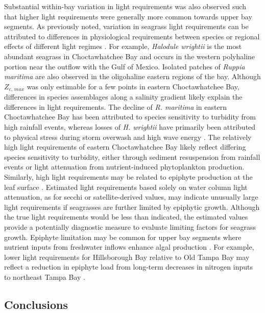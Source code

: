 \documentclass[letterpaper,12pt,oneside]{article}\usepackage[]{graphicx}\usepackage[]{color}
\begin{document}
Substantial within-bay variation in light requirements was also observed such that higher light requirements were generally more common towards upper bay segments.  As previously noted, variation in seagrass light requirements can be attributed to differences in physiological requirements between species or regional effects of different light regimes \citep{Choice14}.  For example, \textit{Halodule wrightii} is the most abundant seagrass in Choctawhatchee Bay and occurs in the western polyhaline portion near the outflow with the Gulf of Mexico.  Isolated patches of \textit{Ruppia maritima} are also observed in the oligohaline eastern regions of the bay. Although $Z_{c,\,max}$ was only estimable for a few points in eastern Choctawhatchee Bay, differences in species assemblages along a salinity gradient likely explain the differences in light requirements. The decline of \textit{R. maritima} in eastern Choctawhatchee Bay has been attributed to species sensitivity to turbidity from high rainfall events, whereas losses of \textit{H. wrightii} have primarily been attributed to physical stress during storm overwash and high wave energy .  The relatively high light requirements of eastern Choctawhatchee Bay likely reflect differing species sensitivity to turbidity, either through sediment resuspension from rainfall events or light attenuation from nutrient-induced phytoplankton production.  Similarly, high light requirements may be related to epiphyte production at the leaf surface \citep{Kemp04}.  Estimated light requirements based solely on water column light attenuation, as for secchi or satellite-derived values, may indicate unusually large light requirements if seagrasses are further limited by epiphytic growth.  Although the true light requirements would be less than indicated, the estimated values provide a potentially diagnostic measure to evaluate limiting factors for seagrass growth.  Epiphyte limitation may be common for upper bay segments where nutrient inputs from freshwater inflows enhance algal production \citep{Kemp04}.  For example, lower light requirements for Hillsborough Bay relative to Old Tampa Bay may reflect a reduction in epiphyte load from long-term decreases in nitrogen inputs to northeast Tampa Bay \citep{Dawes10}.

\subsection{Conclusions}
\end{document}
